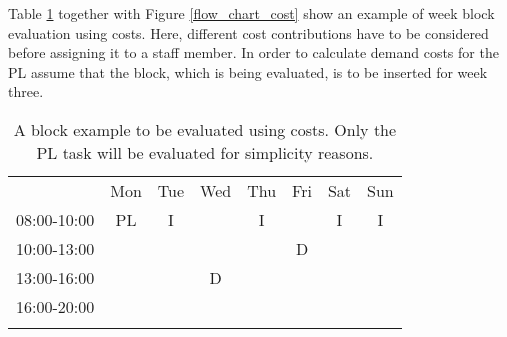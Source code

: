 Table \ref{block_to_evaluate} together with Figure \ref{flow_chart_cost} show an example of week block evaluation using costs. Here, different cost contributions have to be considered before assigning it to a staff member. In order to calculate demand costs for the PL assume that the block, which is being evaluated, is to be inserted for week three.

\begin{table}[!h]
\centering
\caption{A block example to be evaluated using costs. Only the PL task will be evaluated for simplicity reasons.}
\label{block_to_evaluate}
\begin{tabular}{cccccccc}
                                 & Mon                                             & Tue                    & Wed                                            & Thu                    & Fri                                            & Sat                    & Sun                    \\ \cline{2-8} 
\multicolumn{1}{c|}{08:00-10:00} & \multicolumn{1}{c|}{\cellcolor[HTML]{FCFF2F}PL} & \multicolumn{1}{c|}{I} & \multicolumn{1}{c|}{}                          & \multicolumn{1}{c|}{I} & \multicolumn{1}{c|}{}                          & \multicolumn{1}{c|}{I} & \multicolumn{1}{c|}{I} \\ \cline{2-8} 
\multicolumn{1}{c|}{10:00-13:00} & \multicolumn{1}{c|}{\cellcolor[HTML]{FCFF2F}}   & \multicolumn{1}{c|}{}  & \multicolumn{1}{c|}{}                          & \multicolumn{1}{c|}{}  & \multicolumn{1}{c|}{\cellcolor[HTML]{FCFF2F}D} &                        &                        \\ \cline{2-6}
\multicolumn{1}{c|}{13:00-16:00} & \multicolumn{1}{c|}{\cellcolor[HTML]{FCFF2F}}   & \multicolumn{1}{c|}{}  & \multicolumn{1}{c|}{\cellcolor[HTML]{FCFF2F}D} & \multicolumn{1}{c|}{}  & \multicolumn{1}{c|}{}                          &                        &                        \\ \cline{2-6}
\multicolumn{1}{c|}{16:00-20:00} & \multicolumn{1}{c|}{}                           & \multicolumn{1}{c|}{}  & \multicolumn{1}{c|}{}                          & \multicolumn{1}{c|}{}  & \multicolumn{1}{c|}{}                          &                        &                        \\ \cline{2-6}&       &           &       &   &  &      &           \\

\end{tabular}
\end{table}
